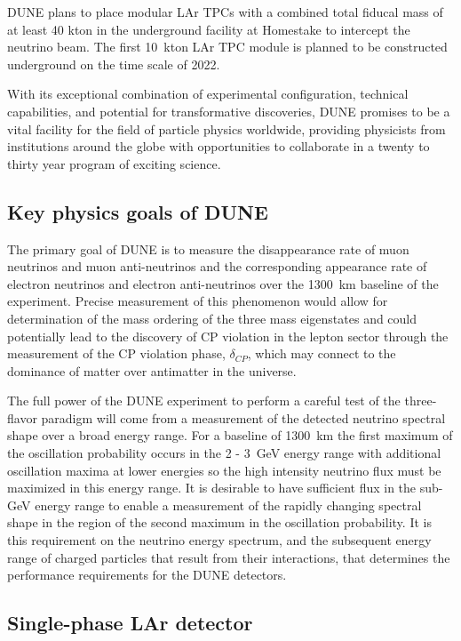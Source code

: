 DUNE plans to place modular LAr TPCs with a combined total fiducal mass of at least  40 kton in the underground facility at Homestake to intercept the neutrino beam.
The first 10~kton LAr TPC module is planned to be constructed underground on the time scale of 2022.

With its exceptional combination of experimental configuration, technical capabilities, and potential for transformative discoveries, DUNE promises to be a vital facility for the field of particle physics worldwide, providing physicists from institutions around the globe with opportunities to collaborate in a twenty to thirty year program of exciting science.



\subsection{Key physics goals of DUNE}


The primary goal of DUNE  is to measure the disappearance rate of muon neutrinos and muon anti-neutrinos and the corresponding appearance rate of electron neutrinos and electron anti-neutrinos over the 1300~km baseline of the experiment. Precise measurement of this
phenomenon would allow for determination of the mass ordering of the three mass eigenstates and could potentially lead to the discovery of CP violation in the lepton sector through the measurement of the
CP violation phase, $\delta_{CP}$, which may connect to the dominance of matter
over antimatter in the universe.	


The full power of the DUNE experiment to perform a careful test of the three-flavor paradigm will come from a measurement of the detected neutrino spectral shape over a broad energy range.  For a baseline of 1300~km the first maximum of the oscillation probability occurs in the 2 - 3~GeV energy range with additional oscillation maxima at lower energies so the high intensity neutrino flux must be maximized in this energy range. It is desirable to have sufficient flux in the sub-GeV energy range to enable a measurement of the rapidly changing spectral shape in the region of the second maximum in the oscillation probability. It is this requirement on the neutrino energy spectrum, and the subsequent energy range of charged particles that result from their interactions, that determines the performance requirements for the DUNE detectors. 


\subsection{Single-phase LAr detector}

